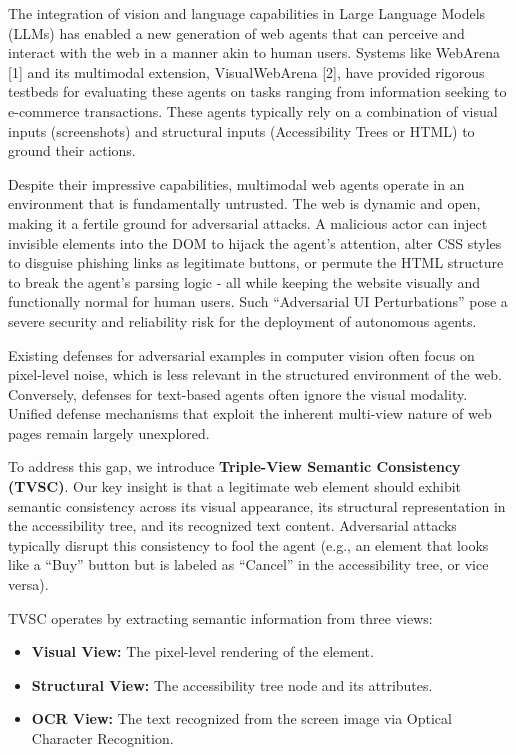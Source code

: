 \documentclass{llncs}
\begin{document}
The integration of vision and language capabilities in Large Language Models (LLMs) has enabled a new generation of web agents that can perceive and interact with the web in a manner akin to human users. Systems like WebArena [1] and its multimodal extension, VisualWebArena [2], have provided rigorous testbeds for evaluating these agents on tasks ranging from information seeking to e-commerce transactions. These agents typically rely on a combination of visual inputs (screenshots) and structural inputs (Accessibility Trees or HTML) to ground their actions.

Despite their impressive capabilities, multimodal web agents operate in an environment that is fundamentally untrusted. The web is dynamic and open, making it a fertile ground for adversarial attacks. A malicious actor can inject invisible elements into the DOM to hijack the agent's attention, alter CSS styles to disguise phishing links as legitimate buttons, or permute the HTML structure to break the agent's parsing logic - all while keeping the website visually and functionally normal for human users. Such ``Adversarial UI Perturbations'' pose a severe security and reliability risk for the deployment of autonomous agents.

Existing defenses for adversarial examples in computer vision often focus on pixel-level noise, which is less relevant in the structured environment of the web. Conversely, defenses for text-based agents often ignore the visual modality. Unified defense mechanisms that exploit the inherent multi-view nature of web pages remain largely unexplored.

To address this gap, we introduce \textbf{Triple-View Semantic Consistency (TVSC)}. Our key insight is that a legitimate web element should exhibit semantic consistency across its visual appearance, its structural representation in the accessibility tree, and its recognized text content. Adversarial attacks typically disrupt this consistency to fool the agent (e.g., an element that looks like a ``Buy'' button but is labeled as ``Cancel'' in the accessibility tree, or vice versa).

TVSC operates by extracting semantic information from three views:
\begin{itemize}
    \item \textbf{Visual View:} The pixel-level rendering of the element.
    \item \textbf{Structural View:} The accessibility tree node and its attributes.
    \item \textbf{OCR View:} The text recognized from the screen image via Optical Character Recognition.
\end{itemize}
\end{document}
